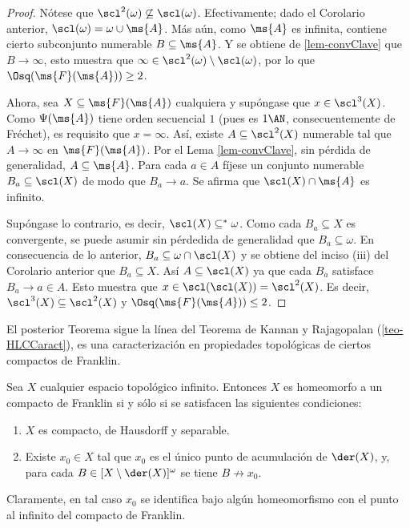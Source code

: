 	\begin{proof} 
		Nótese que $\scl^2(\omega) \not\subseteq \scl(\omega)$. Efectivamente; dado el Corolario anterior, $\scl(\omega) = \omega \cup \ms{A}$. Más aún, como $\ms{A}$ es infinita, contiene cierto subconjunto numerable $B \subseteq \ms{A}$. Y se obtiene de \ref{lem-convClave} que $B \to \infty$, esto muestra que $\infty \in \scl^2(\omega) \setminus \scl(\omega)$, por lo que $\Osq(\ms{F}(\ms{A})) \geq 2$.

		Ahora, sea $X \subseteq \ms{F}(\ms{A})$ cualquiera y supóngase que $x \in \scl^3(X)$. Como $\Psi(\ms{A})$ tiene orden secuencial $1$ (pues es $1\AN$, consecuentemente de Fréchet), es requisito que $x=\infty$. Así, existe $A \subseteq \scl^2(X)$ numerable tal que $A \to \infty$ en $\ms{F}(\ms{A})$. Por el Lema \ref{lem-convClave}, sin pérdida de generalidad, $A \subseteq \ms{A}$. Para cada $a \in A$ fíjese un conjunto numerable $B_a \subseteq \scl(X)$ de modo que $B_a \to a$. Se afirma que $\scl(X) \cap \ms{A}$ es infinito.

		Supóngase lo contrario, es decir, $\scl(X) \subseteq^* \omega$. Como cada $B_a \subseteq X$ es convergente, se puede asumir sin pérdedida de generalidad que $B_a \subseteq \omega$. En consecuencia de lo anterior, $B_a \subseteq \omega \cap \scl(X)$ y se obtiene del inciso (iii) del Corolario anterior que $B_a \subseteq X$. Así $A \subseteq \scl(X)$ ya que cada $B_a$ satisface $B_a \to a \in A$. Esto muestra que $x \in \scl(\scl(X))=\scl^2(X)$. Es decir, $\scl^3(X) \subseteq \scl^2(X)$ y $\Osq(\ms{F}(\ms{A})) \leq 2$.
	\end{proof}

	El posterior Teorema sigue la línea del Teorema de Kannan y Rajagopalan (\ref{teo-HLCCaract}), es una caracterización en propiedades topológicas de ciertos compactos de Franklin.
	\begin{teorema}
		Sea $X$ cualquier espacio topológico infinito. Entonces $X$ es homeomorfo a un compacto de Franklin si y sólo si se satisfacen las siguientes condiciones:
		\begin{enumerate}
			\item $X$ es compacto, de Hausdorff y separable.
			\item Existe $x_0 \in X$ tal que $x_0$ es el único punto de acumulación de $\der(X)$, y, para cada $B \in [X \setminus \der(X)]^\omega$ se tiene $B \not\to x_0$.
		\end{enumerate}
		Claramente, en tal caso $x_0$ se identifica bajo algún homeomorfismo con el punto al infinito del compacto de Franklin.
	\end{teorema}

